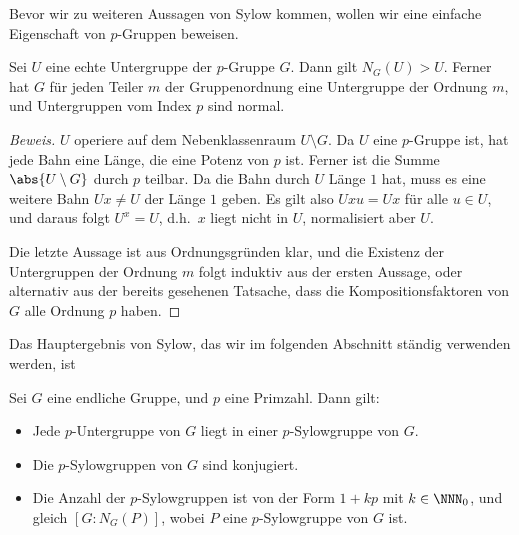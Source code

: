 \documentclass[12pt,a4paper,twoside]{article}
\begin{document}
Bevor wir zu weiteren Aussagen von Sylow kommen, wollen wir eine einfache
Eigenschaft von $p$-Gruppen beweisen.
\begin{Lemma}
  Sei $U$ eine echte Untergruppe der $p$-Gruppe $G$. Dann gilt
  $N_G(U)>U$. Ferner hat $G$ f\"ur jeden Teiler $m$ der Gruppenordnung eine
  Untergruppe der Ordnung $m$, und Untergruppen vom Index $p$ sind normal.
\end{Lemma}
\begin{proof}[Beweis]
  $U$ operiere auf dem Nebenklassenraum $U\setminus G$. Da $U$ eine $p$-Gruppe
  ist, hat jede Bahn eine L\"ange, die eine Potenz von $p$ ist. Ferner ist die
  Summe $\abs{U\setminus G}$ durch $p$ teilbar. Da die Bahn durch $U$ L\"ange
  $1$ hat, muss es eine weitere Bahn $Ux\ne U$ der L\"ange $1$ geben. Es gilt
  also $Uxu=Ux$ f\"ur alle $u\in U$, und daraus folgt $U^x=U$, d.h.\ $x$ liegt
  nicht in $U$, normalisiert aber $U$.
  
  Die letzte Aussage ist aus Ordnungsgr\"unden klar, und die Existenz der
  Untergruppen der Ordnung $m$ folgt induktiv aus der ersten Aussage, oder
  alternativ aus der bereits gesehenen Tatsache, dass die Kompositionsfaktoren
  von $G$ alle Ordnung $p$ haben.
\end{proof}
Das Hauptergebnis von Sylow, das wir im folgenden Abschnitt st\"andig
verwenden werden, ist
\begin{Satz}[Sylow]\label{S:Sylow2}
  Sei $G$ eine endliche Gruppe, und $p$ eine Primzahl. Dann gilt:
  \begin{itemize}
  \item[(a)] Jede $p$-Untergruppe von $G$ liegt in einer $p$-Sylowgruppe von
  $G$.
\item[(b)] Die $p$-Sylowgruppen von $G$ sind konjugiert.
\item[(c)] Die Anzahl der $p$-Sylowgruppen ist von der Form $1+kp$ mit
  $k\in\NNN_0$, und gleich $[G:N_G(P)]$, wobei $P$ eine $p$-Sylowgruppe von
  $G$ ist.
  \end{itemize}
\end{Satz}
\end{document}
